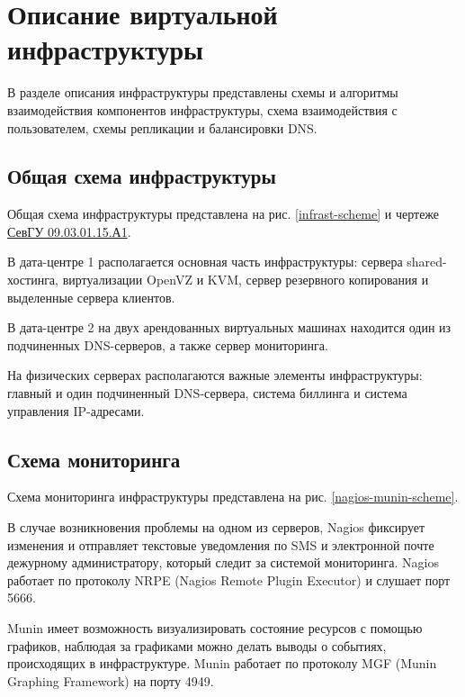 \section{Описание виртуальной инфраструктуры}

В разделе описания инфраструктуры представлены схемы и алгоритмы взаимодействия компонентов инфраструктуры, схема взаимодействия с пользователем, схемы репликации и балансировки DNS.

\subsection{Общая схема инфраструктуры}

Общая схема инфраструктуры представлена на рис. \ref{infrast-scheme} и чертеже \href{extra/drafts/SevGU_09.03.01.15.A1.pdf}{СевГУ 09.03.01.15.А1}.

В дата-центре 1 располагается основная часть инфраструктуры: сервера shared-хостинга, виртуализации OpenVZ и KVM, сервер резервного копирования и выделенные сервера клиентов.

В дата-центре 2 на двух арендованных виртуальных машинах находится один из подчиненных DNS-серверов, а также сервер мониторинга.

На физических серверах располагаются важные элементы инфраструктуры: главный и один подчиненный DNS-сервера, система биллинга и система управления IP-адресами.

\subsection{Схема мониторинга}

Схема мониторинга инфраструктуры представлена на рис. \ref{nagios-munin-scheme}.

В случае возникновения проблемы на одном из серверов, Nagios фиксирует изменения и отправляет текстовые уведомления по SMS и электронной почте дежурному администратору, который следит за системой мониторинга.
Nagios работает по протоколу NRPE (Nagios Remote Plugin Executor) и слушает порт 5666.

Munin имеет возможность визуализировать состояние ресурсов с помощью графиков, наблюдая за графиками можно делать выводы о событиях, происходящих в инфраструктуре.
Munin работает по протоколу MGF (Munin Graphing Framework) на порту 4949.

